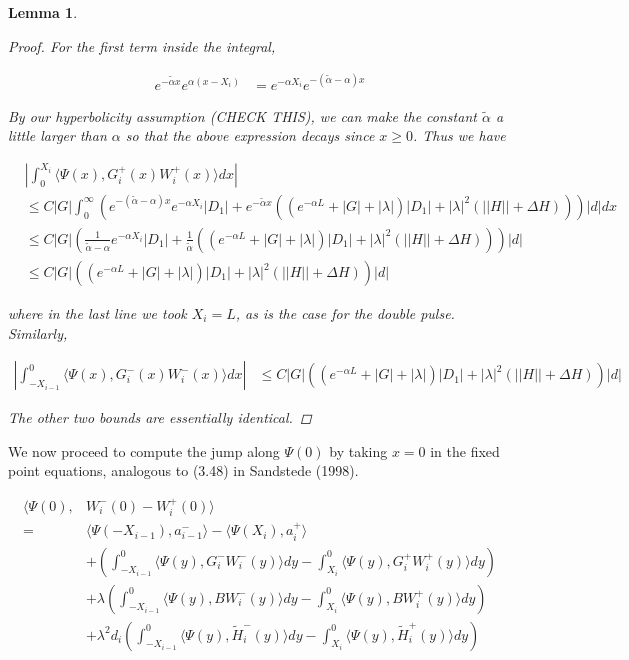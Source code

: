 \documentclass[12pt]{article}
\newtheorem{lemma}{Lemma}
\begin{document}
\begin{lemma}
\begin{proof}
For the first term inside the integral,

\begin{align*}
e^{-\tilde{\alpha} x} e^{\alpha(x - X_{i})} &= e^{-\alpha X_i} e^{-(\tilde{\alpha} - \alpha)x}
\end{align*}

By our hyperbolicity assumption (CHECK THIS), we can make the constant $\tilde{\alpha}$ a little larger than $\alpha$ so that the above expression decays since $x \geq 0$. Thus we have

\begin{align*}
&\left| \int_0^{X_i} \langle \Psi(x), G_i^+(x) W_i^+(x) \rangle dx \right| \\
&\leq C|G| \int_0^{\infty} \left(  e^{-(\tilde{\alpha} - \alpha)x} e^{-\alpha X_i} |D_1| +  e^{-\tilde{\alpha} x} \left( (e^{-\alpha L} + |G| + |\lambda| ) |D_1| + |\lambda|^2 ( ||H|| + \Delta H )\right) \right) |d|dx \\
&\leq C|G| \left(  \frac{1}{\tilde{\alpha} - \alpha}e^{-\alpha X_i}|D_1| + \frac{1}{\tilde{\alpha}}\left( (e^{-\alpha L} + |G| + |\lambda| ) |D_1| + |\lambda|^2 ( ||H|| + \Delta H )\right) \right)|d| \\
&\leq C|G| \left( \left(e^{-\alpha L} + |G| + |\lambda|  \right) |D_1| + |\lambda|^2 \left(||H|| + \Delta H\right) \right)|d|
\end{align*}

where in the last line we took $X_i = L$, as is the case for the double pulse. Similarly,

\begin{align*}
\left| \int_{-X_{i-1}}^0 \langle \Psi(x), G_i^-(x) W_i^-(x) \rangle dx \right| &\leq C|G| \left( \left(e^{-\alpha L} + |G| + |\lambda|  \right) |D_1| + |\lambda|^2 \left(||H|| + \Delta H\right) \right)|d|
\end{align*}

The other two bounds are essentially identical.

\end{proof}
\end{lemma}

We now proceed to compute the jump along $\Psi(0)$ by taking $x = 0$ in the fixed point equations, analogous to (3.48) in Sandstede (1998).

\begin{align*}
\langle \Psi(0), &W_i^-(0) - W_i^+(0) \rangle \\
= &\langle \Psi(-X_{i-1}), a_{i-1}^-\rangle - \langle \Psi(X_i), a_{i}^+\rangle \\
&+\left( \int_{-X_{i-1}}^0 \langle \Psi(y), G_i^- W_i^-(y) \rangle dy - \int_{X_i}^0 \langle \Psi(y), G_i^+ W_i^+(y) \rangle dy \right) \\
&+ \lambda\left( \int_{-X_{i-1}}^0 \langle \Psi(y), B W_i^-(y) \rangle dy - \int_{X_i}^0 \langle \Psi(y), B W_i^+(y) \rangle dy \right) \\
&+\lambda^2 d_i \left( \int_{-X_{i-1}}^0 \langle \Psi(y), \tilde{H}_i^-(y) \rangle dy - \int_{X_i}^0 \langle \Psi(y), \tilde{H}_i^+(y) \rangle dy \right)
\end{align*}
\end{document}
